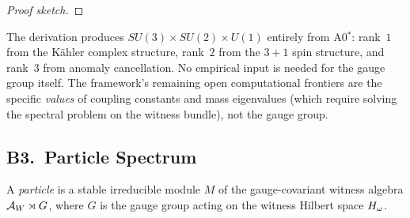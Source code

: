 \begin{theorem}
\begin{proof}[Proof sketch]
\end{proof}
\end{theorem}

\begin{remark}
\label{rem:gauge-honesty}
The derivation produces $SU(3) \times SU(2) \times U(1)$ entirely from
A0$^*$: rank~$1$ from the K\"{a}hler complex structure, rank~$2$ from the
$3{+}1$ spin structure, and rank~$3$ from anomaly cancellation.  No
empirical input is needed for the gauge group itself.  The framework's
remaining open computational frontiers are the specific \emph{values}
of coupling constants and mass eigenvalues (which require solving the
spectral problem on the witness bundle), not the gauge group.
\end{remark}

\subsection{B3.\ Particle Spectrum}
\label{sec:physics:particles}

\begin{definition}
\label{def:particle}
A \emph{particle} is a stable irreducible module $M$ of the gauge-covariant
witness algebra $\mathcal{A}_W \rtimes G$, where $G$ is the gauge group acting on
the witness Hilbert space $H_\omega$.
\end{definition}

